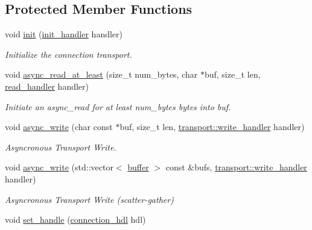 \subsection*{Protected Member Functions}
\begin{DoxyCompactItemize}
\item 
void \hyperlink{classwebsocketpp_1_1transport_1_1iostream_1_1connection_a771203b134cc012188a07c471907fc76}{init} (\hyperlink{namespacewebsocketpp_1_1transport_aeae75e675c1a334b3b33ab7120b480a5}{init\+\_\+handler} handler)
\begin{DoxyCompactList}\small\item\em Initialize the connection transport. \end{DoxyCompactList}\item 
void \hyperlink{classwebsocketpp_1_1transport_1_1iostream_1_1connection_ad66fa146a7cdc19bfca3e32da23b9c60}{async\+\_\+read\+\_\+at\+\_\+least} (size\+\_\+t num\+\_\+bytes, char $\ast$buf, size\+\_\+t len, \hyperlink{namespacewebsocketpp_1_1transport_a3a9b2ed54dfcc6ebe7d7e6b4c02f53fb}{read\+\_\+handler} handler)
\begin{DoxyCompactList}\small\item\em Initiate an async\+\_\+read for at least num\+\_\+bytes bytes into buf. \end{DoxyCompactList}\item 
void \hyperlink{classwebsocketpp_1_1transport_1_1iostream_1_1connection_a6bc18b4c6b20bb9bc5d0c41cad53d602}{async\+\_\+write} (char const $\ast$buf, size\+\_\+t len, \hyperlink{namespacewebsocketpp_1_1transport_addf5d728159e7aa2bce2a0df947b1560}{transport\+::write\+\_\+handler} handler)
\begin{DoxyCompactList}\small\item\em Asyncronous Transport Write. \end{DoxyCompactList}\item 
void \hyperlink{classwebsocketpp_1_1transport_1_1iostream_1_1connection_adcc51157786a27f08ffea25025b6d4f8}{async\+\_\+write} (std\+::vector$<$ \hyperlink{structwebsocketpp_1_1transport_1_1buffer}{buffer} $>$ const \&bufs, \hyperlink{namespacewebsocketpp_1_1transport_addf5d728159e7aa2bce2a0df947b1560}{transport\+::write\+\_\+handler} handler)
\begin{DoxyCompactList}\small\item\em Asyncronous Transport Write (scatter-\/gather) \end{DoxyCompactList}\item 
void \hyperlink{classwebsocketpp_1_1transport_1_1iostream_1_1connection_ac565af9c7f9e86972fd1c20bc369f06d}{set\+\_\+handle} (\hyperlink{namespacewebsocketpp_a6b3d26a10ee7229b84b776786332631d}{connection\+\_\+hdl} hdl)

\end{DoxyCompactItemize}
